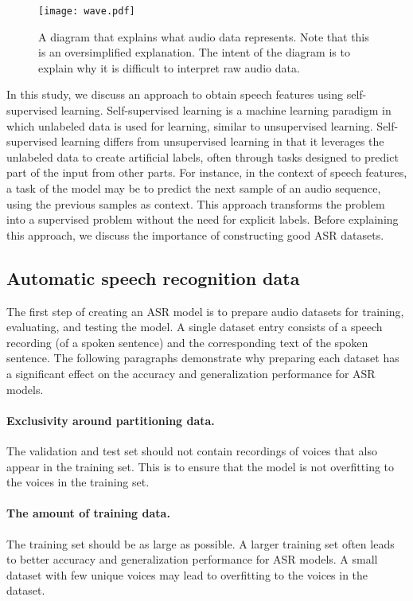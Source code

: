 \begin{figure}[!ht]
    \centering
    \texttt{[image: wave.pdf]}
    \caption{A diagram that explains what audio data represents. Note that this is an oversimplified explanation. The intent of the diagram is to explain why it is difficult to interpret raw audio data.}
    \label{fig:wave}
\end{figure}

In this study, we discuss an approach to obtain speech features using self-supervised learning.
Self-supervised learning is a machine learning paradigm in which unlabeled data is used for learning, similar to unsupervised learning.
Self-supervised learning differs from unsupervised learning in that it leverages the unlabeled data to create artificial labels, 
often through tasks designed to predict part of the input from other parts. 
For instance, in the context of speech features, a task of the model may be to predict the next sample of an audio sequence, 
using the previous samples as context.
This approach transforms the problem into a supervised problem without the need for explicit labels. 
Before explaining this approach, we discuss the importance of constructing good ASR datasets.

\subsection{Automatic speech recognition data}
The first step of creating an ASR model is to prepare audio datasets for training, evaluating, and testing the model.
A single dataset entry consists of a speech recording (of a spoken sentence) and the corresponding text of the spoken sentence.
The following paragraphs demonstrate why preparing each dataset
has a significant effect on the accuracy and generalization performance for ASR models.

\paragraph*{Exclusivity around partitioning data.}
The validation and test set should not contain recordings of voices that also appear in the training set.
This is to ensure that the model is not overfitting to the voices in the training set.

\paragraph*{The amount of training data.}
The training set should be as large as possible.
A larger training set often leads to better accuracy and generalization performance for ASR models.
A small dataset with few unique voices may lead to overfitting to the voices in the dataset.

